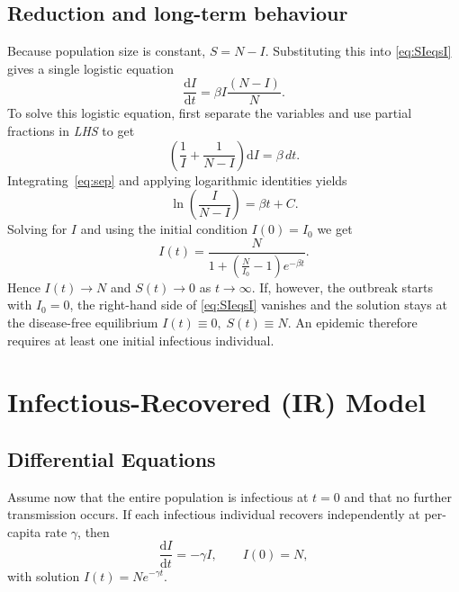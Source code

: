 \documentclass[11pt]{article}
\begin{document}
\subsection*{Reduction and long-term behaviour}
Because population size is constant, \(S = N - I\).
Substituting this into \cref{eq:SIeqsI} gives a single logistic equation 
\[
\frac{\mathrm{d}I}{\mathrm{d}t} = \beta I \frac{(N-I)}{N}
.\]
To solve this logistic equation, first separate the variables and use partial fractions in \emph{LHS} to get
\begin{equation}\label{eq:sep}
\left ( \frac{1}{I} + \frac{1}{N-I} \right ) \mathrm{d}I = \beta \, dt. 
\end{equation}
Integrating~\cref{eq:sep} and applying logarithmic identities yields
\[
\ln \left ( \frac{I}{N-I} \right )= \beta t + C.
\]
Solving for \(I\) and using the initial condition \(I(0) = I_0\) we get
\[
I(t) = \frac{N}{1+\left (\frac{N}{I_0}-1\right)e^{-\beta t}}
.\]
Hence \(I(t)\to N\) and \(S(t)\to 0\) as \(t\to\infty\).
If, however, the outbreak starts with \(I_0 = 0\), the right-hand side of \eqref{eq:SIeqsI} vanishes and the solution stays at the disease-free equilibrium \(I(t)\equiv0,\;S(t)\equiv N\).  An epidemic therefore requires at least one initial infectious individual.

\section{Infectious-Recovered (IR) Model}\label{sec:IR}
\subsection*{Differential Equations}
Assume now that the entire population is infectious at \(t=0\) and that no further
transmission occurs.  
If each infectious individual recovers independently at per-capita rate
\(\gamma\), then
\begin{equation*}
\frac{\mathrm{d}I}{\mathrm{d}t} = -\gamma I, \qquad I(0)=N,
\end{equation*}
with solution \(I(t)=N e^{-\gamma t}\). 
\end{document}

